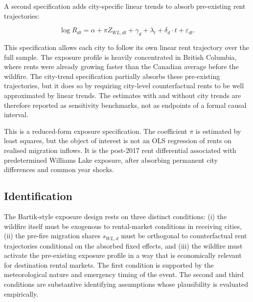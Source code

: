 \documentclass[12pt]{article}
\begin{document}
A second specification adds city-specific linear trends to absorb pre-existing rent trajectories:

\begin{equation}
\log R_{dt} = \alpha + \pi Z_{WL,dt} + \gamma_d + \lambda_t
+ \delta_d \cdot t + \varepsilon_{dt}.
\label{eq:trends}
\end{equation}

This specification allows each city to follow its own linear rent trajectory
over the full sample. The exposure
profile is heavily concentrated in British Columbia, where rents were already
growing faster than the Canadian average before the wildfire. The city-trend
specification partially absorbs these pre-existing trajectories, but it does so
by requiring city-level counterfactual rents to be well approximated by linear trends. The estimates with and without city trends
are therefore reported as sensitivity benchmarks, not as endpoints of a formal
causal interval.

This is a reduced-form exposure specification. The coefficient $\pi$ is estimated
by least squares, but the object of interest is not an OLS regression of rents on
realised migration inflows. It is the post-2017 rent differential associated with
predetermined Williams Lake exposure, after absorbing permanent city differences
and common year shocks.
\subsection{Identification}
\label{sec:threats}

The Bartik-style exposure design rests on three distinct conditions: (i) the wildfire
itself must be exogenous to rental-market conditions in receiving cities, (ii) the
pre-fire migration shares $s_{WL,d}$ must be orthogonal to counterfactual rent
trajectories conditional on the absorbed fixed effects, and (iii) the wildfire must
activate the pre-existing exposure profile in a way that is economically relevant
for destination rental markets. The first condition is supported by the
meteorological nature and emergency timing of the event. The second and third
conditions are substantive identifying assumptions whose plausibility is
evaluated empirically.
\end{document}
